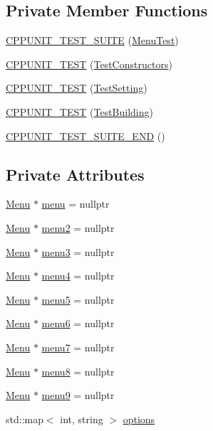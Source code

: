 \subsection*{Private Member Functions}
\begin{DoxyCompactItemize}
\item 
\hyperlink{classMenuTest_ab45183ab71d4ba80dc011c1c8644f174}{C\-P\-P\-U\-N\-I\-T\-\_\-\-T\-E\-S\-T\-\_\-\-S\-U\-I\-T\-E} (\hyperlink{classMenuTest}{Menu\-Test})
\item 
\hyperlink{classMenuTest_a24b434b2d0f375ed54fee29c0ac704ee}{C\-P\-P\-U\-N\-I\-T\-\_\-\-T\-E\-S\-T} (\hyperlink{classMenuTest_a8937223971935c31487f46a00d294e97}{Test\-Constructors})
\item 
\hyperlink{classMenuTest_a1cdba567656a3c9ab7056913dcc3c7bc}{C\-P\-P\-U\-N\-I\-T\-\_\-\-T\-E\-S\-T} (\hyperlink{classMenuTest_ab0a87d1e4ee856ccf3af3cc6663845c4}{Test\-Setting})
\item 
\hyperlink{classMenuTest_ac4f7a497c3b2ff88e841ebc4b4cee318}{C\-P\-P\-U\-N\-I\-T\-\_\-\-T\-E\-S\-T} (\hyperlink{classMenuTest_af74ddfe672fb68438b3e966c3736a763}{Test\-Building})
\item 
\hyperlink{classMenuTest_ae361a2aeef4a50756b043b8b658f9add}{C\-P\-P\-U\-N\-I\-T\-\_\-\-T\-E\-S\-T\-\_\-\-S\-U\-I\-T\-E\-\_\-\-E\-N\-D} ()
\end{DoxyCompactItemize}
\subsection*{Private Attributes}
\begin{DoxyCompactItemize}
\item 
\hyperlink{classMenu}{Menu} $\ast$ \hyperlink{classMenuTest_a1112471b20626234fa45958cce6ed8d5}{menu} = nullptr
\item 
\hyperlink{classMenu}{Menu} $\ast$ \hyperlink{classMenuTest_a9d994a71bc3d2d182f63030492aeb84d}{menu2} = nullptr
\item 
\hyperlink{classMenu}{Menu} $\ast$ \hyperlink{classMenuTest_aa0b6345a277c369961506cc226348980}{menu3} = nullptr
\item 
\hyperlink{classMenu}{Menu} $\ast$ \hyperlink{classMenuTest_ae9fc6704685a65a231a808bba2f084bb}{menu4} = nullptr
\item 
\hyperlink{classMenu}{Menu} $\ast$ \hyperlink{classMenuTest_a3168d728cd24da638261f21ae954b553}{menu5} = nullptr
\item 
\hyperlink{classMenu}{Menu} $\ast$ \hyperlink{classMenuTest_a0f507b48519d19324b23abdeb772d401}{menu6} = nullptr
\item 
\hyperlink{classMenu}{Menu} $\ast$ \hyperlink{classMenuTest_a390ce6025e9e31885105b625fcd099d7}{menu7} = nullptr
\item 
\hyperlink{classMenu}{Menu} $\ast$ \hyperlink{classMenuTest_aa86ecdd3de31afd09a942032d48139d1}{menu8} = nullptr
\item 
\hyperlink{classMenu}{Menu} $\ast$ \hyperlink{classMenuTest_a0ffac80371c29a88860328242666307f}{menu9} = nullptr
\item 
std\-::map$<$ int, string $>$ \hyperlink{classMenuTest_a315fe94d0bb3bf2d550d5bd326ac99a0}{options}
\end{DoxyCompactItemize}


